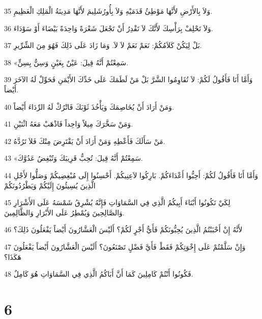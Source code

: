 \par 35 وَلاَ بِالأَرْضِ لأَنَّهَا مَوْطِئُ قَدَمَيْهِ وَلاَ بِأُورُشَلِيمَ لأَنَّهَا مَدِينَةُ الْمَلِكِ الْعَظِيمِ.
\par 36 وَلاَ تَحْلِفْ بِرَأْسِكَ لأَنَّكَ لاَ تَقْدِرُ أَنْ تَجْعَلَ شَعْرَةً وَاحِدَةً بَيْضَاءَ أَوْ سَوْدَاءَ.
\par 37 بَلْ لِيَكُنْ كَلاَمُكُمْ: نَعَمْ نَعَمْ لاَ لاَ. وَمَا زَادَ عَلَى ذَلِكَ فَهُوَ مِنَ الشِّرِّيرِ.
\par 38 «سَمِعْتُمْ أَنَّهُ قِيلَ: عَيْنٌ بِعَيْنٍ وَسِنٌّ بِسِنٍّ.
\par 39 وَأَمَّا أَنَا فَأَقُولُ لَكُمْ: لاَ تُقَاوِمُوا الشَّرَّ بَلْ مَنْ لَطَمَكَ عَلَى خَدِّكَ الأَيْمَنِ فَحَوِّلْ لَهُ الآخَرَ أَيْضاً.
\par 40 وَمَنْ أَرَادَ أَنْ يُخَاصِمَكَ وَيَأْخُذَ ثَوْبَكَ فَاتْرُكْ لَهُ الرِّدَاءَ أَيْضاً.
\par 41 وَمَنْ سَخَّرَكَ مِيلاً وَاحِداً فَاذْهَبْ مَعَهُ اثْنَيْنِ.
\par 42 مَنْ سَأَلَكَ فَأَعْطِهِ وَمَنْ أَرَادَ أَنْ يَقْتَرِضَ مِنْكَ فَلاَ تَرُدَّهُ.
\par 43 «سَمِعْتُمْ أَنَّهُ قِيلَ: تُحِبُّ قَرِيبَكَ وَتُبْغِضُ عَدُوَّكَ.
\par 44 وَأَمَّا أَنَا فَأَقُولُ لَكُمْ: أَحِبُّوا أَعْدَاءَكُمْ. بَارِكُوا لاَعِنِيكُمْ. أَحْسِنُوا إِلَى مُبْغِضِيكُمْ وَصَلُّوا لأَجْلِ الَّذِينَ يُسِيئُونَ إِلَيْكُمْ وَيَطْرُدُونَكُمْ
\par 45 لِكَيْ تَكُونُوا أَبْنَاءَ أَبِيكُمُ الَّذِي فِي السَّمَاوَاتِ فَإِنَّهُ يُشْرِقُ شَمْسَهُ عَلَى الأَشْرَارِ وَالصَّالِحِينَ وَيُمْطِرُ عَلَى الأَبْرَارِ وَالظَّالِمِينَ.
\par 46 لأَنَّهُ إِنْ أَحْبَبْتُمُ الَّذِينَ يُحِبُّونَكُمْ فَأَيُّ أَجْرٍ لَكُمْ؟ أَلَيْسَ الْعَشَّارُونَ أَيْضاً يَفْعَلُونَ ذَلِكَ؟
\par 47 وَإِنْ سَلَّمْتُمْ عَلَى إِخْوَتِكُمْ فَقَطْ فَأَيَّ فَضْلٍ تَصْنَعُونَ؟ أَلَيْسَ الْعَشَّارُونَ أَيْضاً يَفْعَلُونَ هَكَذَا؟
\par 48 فَكُونُوا أَنْتُمْ كَامِلِينَ كَمَا أَنَّ أَبَاكُمُ الَّذِي فِي السَّمَاوَاتِ هُوَ كَامِلٌ.

\chapter{6}

